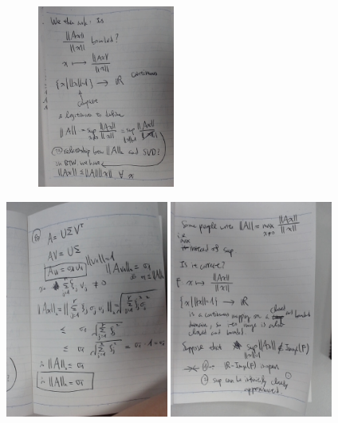 \documentclass{article}
\begin{document}
\begin{figure}
\includegraphics[width=0.4\textwidth]{02-moti_cont.jpg}
\end{figure}



\includegraphics[width=0.4\textwidth]{03-2norm_and_singular_value.jpg}
\includegraphics[width=0.4\textwidth]{04-max_instead.jpg}
\end{document}

